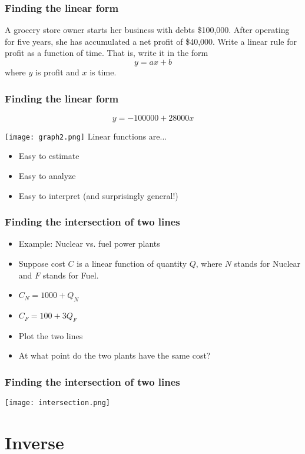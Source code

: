 \documentclass[xcolor=dvipsnames, 9pt]{beamer} %
\begin{document}
\begin{frame}
\frametitle{Finding the linear form}

A grocery store owner starts her business with debts \$100,000. After operating for five years, she has accumulated a net profit of \$40,000. Write a linear rule for profit as a function of time. That is, write it in the form $$ y = ax + b$$ where $y$ is profit and $x$ is time. 

\end{frame}

\begin{frame}
\frametitle{Finding the linear form}

$$ y = -100000 + 28000x $$

\hspace*{-0.6cm} \texttt{[image: graph2.png]}
Linear functions are... 
\begin{itemize}
\item Easy to estimate 
\item Easy to analyze
\item Easy to interpret (and surprisingly general!)
\end{itemize}
\end{frame}

\begin{frame}
\frametitle{Finding the intersection of two lines}
\begin{itemize}
	\itemsep\setlength{1em}
		\item Example: Nuclear vs. fuel power plants 
		\item Suppose cost $C$ is a linear function of quantity $Q$, where $N$ stands for Nuclear and $F$ stands for Fuel.
		\item[] $C_N = 1000 + Q_N$
		\item[] $C_F = 100 + 3Q_F$
		\item Plot the two lines
		\item At what point do the two plants have the same cost?
\end{itemize}

\end{frame}

\begin{frame}
\frametitle{Finding the intersection of two lines}
\begin{center}
\texttt{[image: intersection.png]}
\end{center}
\end{frame}

\section{Inverse}
\end{document}
